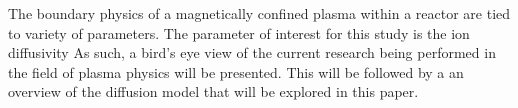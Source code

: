 \documentclass{article}
\begin{document}
%
%
%

 \cite{PPPL_P:2}
The boundary physics of a magnetically confined plasma within a reactor are tied to variety of parameters. The parameter of interest for this study is the ion diffusivity 
As such, a bird's eye view of the current research being performed in the field of plasma physics will be presented. \cite{J_Friedberg:1}
This will be followed by a an overview of the diffusion model that will be explored in this paper.\\
\end{document}
